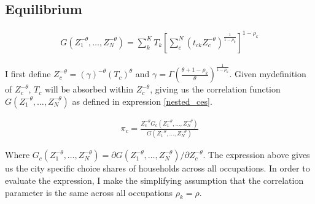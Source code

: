 \documentclass[10pt]{article}
\begin{document}


\subsection{Equilibrium}

\begin{align}
    G(Z_1^{- \theta}, \dots, Z_N^{- \theta}) = \sum_{k}^{K} T_k \left[ \sum_{c}^{N} (t_{ck} Z_c^{- \theta})^{\frac{1}{1 - \rho_k}} \right]^{1 - \rho_k}
    \label{nested_ces}
\end{align}

I first define $Z_c^{- \theta} = (\gamma)^{- \theta} (T_c)^{\theta}$ and $\gamma = \Gamma (\frac{\theta + 1 - \rho_k}{\theta})^{\frac{1}{1 - \rho_k}}$. Given mydefinition of $Z_c^{- \theta}$, $T_c$ will be absorbed within $Z_c^{- \theta}$, giving us the correlation function $G(Z_1^{- \theta}, \dots, Z_N^{- \theta})$ as defined in expression \ref{nested_ces}.

\begin{align*}
    \pi_c = \frac{Z_c^{- \theta} G_c(Z_1^{- \theta}, \dots, Z_N^{- \theta})}{G(Z_1^{- \theta}, \dots, Z_N^{- \theta})}
\end{align*}

Where $G_c (Z_1^{- \theta}, \dots, Z_N^{- \theta}) = \partial G(Z_1^{- \theta}, \dots, Z_N^{- \theta}) / \partial Z_c^{- \theta}$. The expression above gives us the city specific choice shares of households across all occupations. In order to evaluate the expression, I make the simplifying assumption that the correlation parameter is the same across all occupations $\rho_k = \rho$.
\end{document}
